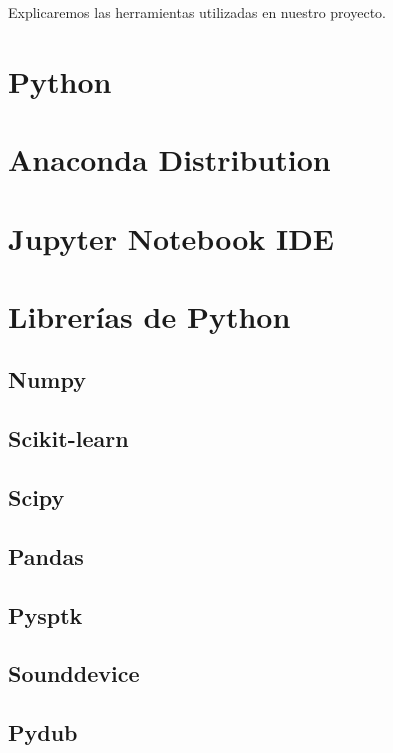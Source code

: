 
Explicaremos las herramientas utilizadas en nuestro proyecto.

\section{Python}


\section{Anaconda Distribution}


\section{Jupyter Notebook IDE}


\section{Librerías de Python}
\subsection{Numpy}


\subsection{Scikit-learn}


\subsection{Scipy}


\subsection{Pandas}


\subsection{Pysptk}


\subsection{Sounddevice}


\subsection{Pydub}


